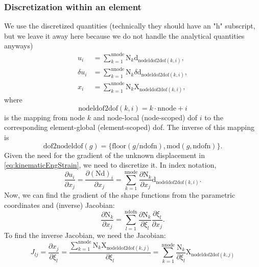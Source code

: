 \documentclass[12pt,a4paper]{article}
\theoremstyle{remark} %
\numberwithin{equation}{section} %
\begin{document}
\subsubsection{Discretization within an element}
We use the discretized quantities (technically they should have an "h" subscript, but we leave it away here because we do not handle the analytical quantities anyways)
\begin{align}
	u_i &= \sum_{k = 1}^{\text{nnode}} \mathrm N_k \mathrm d_{\text{nodeldof2dof}(k, i)} , \\
	\delta u_i &= \sum_{k = 1}^{\text{nnode}} \mathrm N_k \delta \mathrm d_{\text{nodeldof2dof}(k, i)} , \\
	x_i &= \sum_{k = 1}^{\text{nnode}} \mathrm N_k \mathrm X_{\text{nodeldof2dof}(k, i)} ,
\end{align}
where
\begin{equation}
	\text{nodeldof2dof}(k, i) = k \cdot \text{nnode} + i
\end{equation}
is the mapping from node $k$ and node-local (node-scoped) dof $i$ to the corresponding element-global (element-scoped) dof. The inverse of this mapping is
\begin{equation}
	\text{dof2nodeldof}(g) = \{\text{floor}(g/\text{ndofn}), \text{mod}(g, \text{ndofn})\} .
\end{equation}
%
Given the need for the gradient of the unknown displacement in \ref{eq:kinematicEngStrain}, we need to discretize it. In index notation,
\begin{equation}
	\frac{\partial u_i}{\partial x_j} = \frac{\partial (\mathrm N \mathrm d)_i}{\partial x_j} = \sum_{k = 1}^{\text{nnode}} \frac{\partial \mathrm N_k}{\partial x_j} \mathrm d_{\text{nodeldof2dof}(k, i)} .
\end{equation}
%
Now, we can find the gradient of the shape functions from the parametric coordinates and (inverse) Jacobian:
\begin{equation}
	\frac{\partial \mathrm N_k}{\partial x_j} = \sum_{l = 1}^{\text{ndofn}} \frac{\partial \mathrm N_k}{\partial \xi_l} \frac{\partial \xi_l}{\partial x_j}.
\end{equation}
To find the inverse Jacobian, we need the Jacobian:
\begin{equation}
	J_{lj} = \frac{\partial x_j}{\partial \xi_l} = \frac{\sum_{k = 1}^{\text{nnode}} \mathrm N_k \mathrm X_{\text{nodeldof2dof}(k, j)}}{\partial \xi_l} = \sum_{k = 1}^{\text{nnode}} \frac{\mathrm N_k}{\partial \xi_l} \mathrm X_{\text{nodeldof2dof}(k, j)}
\end{equation}
\end{document}

